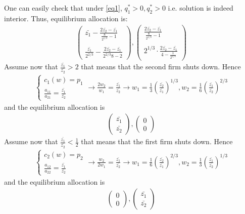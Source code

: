 \documentclass[a4paper]{article}
\begin{document}
One can easily check that under \eqref{eq1}, $q_1^* > 0, q_2^* > 0$ i.e. solution is indeed interior. Thus, equilibrium allocation is:
\begin{align*}
\begin{pmatrix}
\bar{z_1} - \frac{2\bar{z_2} - \bar{z_1}}{\frac{8}{2^{1/3}} - 1}\\
\\
\frac{\bar{z_1}}{2^{2/3}} - \frac{2\bar{z_2} - \bar{z_1}}{2^{2/3}8 - 2}
\end{pmatrix}, \begin{pmatrix}
\frac{2\bar{z_2} - \bar{z_1}}{\frac{8}{2^{1/3}} - 1}\\
\\
2^{1/3} \cdot \frac{2\bar{z_2} - \bar{z_1}}{4 - \frac{1}{2^{2/3}}}
\end{pmatrix}
\end{align*}
Assume now that $\frac{\bar{z_1}}{\bar{z_2}} > 2$ that means that the second firm shuts down. Hence
\begin{align*}
\begin{cases}
c_1(w) = p_1\\
\frac{a_{11}}{a_{21}} = \frac{\bar{z_1}}{\bar{z_2}}
\end{cases} \to \frac{2w_2}{w_1} = \frac{\bar{z_1}}{\bar{z_2}} \to w_1 = \frac{1}{3}\left(\frac{\bar{z_2}}{\bar{z_1}}\right)^{1/3}, w_2 = \frac{1}{6}\left(\frac{\bar{z_1}}{\bar{z_2}}\right)^{2/3}
\end{align*}
and the equilibrium allocation is
\begin{align*}
\begin{pmatrix}
\bar{z_1}\\
\bar{z_2}
\end{pmatrix}, \begin{pmatrix}
0\\
0
\end{pmatrix}
\end{align*}
Assume now that $\frac{\bar{z_1}}{\bar{z_2}} < \frac{1}{2}$ that means that the first firm shuts down. Hence
\begin{align*}
\begin{cases}
c_2(w) = p_2\\
\frac{a_{12}}{a_{22}} = \frac{\bar{z_1}}{\bar{z_2}}
\end{cases} \to \frac{w_2}{2w_1} = \frac{\bar{z_1}}{\bar{z_2}} \to w_1 = \frac{1}{6}\left(\frac{\bar{z_2}}{\bar{z_1}}\right)^{2/3}, w_2 = \frac{1}{3}\left(\frac{\bar{z_1}}{\bar{z_2}}\right)^{1/3}
\end{align*}
and the equilibrium allocation is
\begin{align*}
\begin{pmatrix}
0\\
0
\end{pmatrix},
\begin{pmatrix}
\bar{z_1}\\
\bar{z_2}
\end{pmatrix}
\end{align*}
\end{document}
